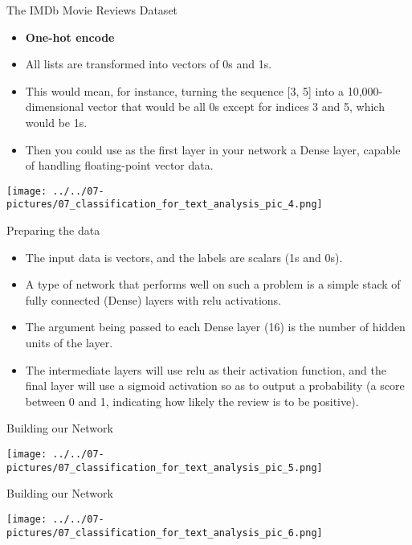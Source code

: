 \documentclass[11pt]{beamer}
\begin{document}
\begin{frame}{The IMDb Movie Reviews Dataset}
	\begin{itemize}
		\item \textbf{One-hot encode}
		\item All lists are transformed into vectors of 0s and 1s. 
		\item This would mean, for instance, turning the sequence [3, 5] into a 10,000-dimensional vector that would be all 0s except for indices 3 and 5, which would be 1s. 
		\item Then you could use as the first layer in your network a Dense layer, capable of handling floating-point vector data.
	\end{itemize}
	\begin{center}
	\texttt{[image: ../../07-pictures/07\_classification\_for\_text\_analysis\_pic\_4.png]}
	\end{center}
\end{frame}
\begin{frame}{Preparing the data}
	\begin{itemize}
		\item The input data is vectors, and the labels are scalars (1s and 0s). 
		\item A type of network that performs well on such a problem is a simple stack of fully connected (Dense) layers with relu activations.
		\item The argument being passed to each Dense layer (16) is the number of hidden units of the layer.
		\item The intermediate layers will use relu as their activation function, and the final layer will use a sigmoid activation so as to output a probability (a score between 0 and 1, indicating how likely the review is to be positive). 
	\end{itemize}
\end{frame}
\begin{frame}{Building our Network}
	\begin{center}
	\texttt{[image: ../../07-pictures/07\_classification\_for\_text\_analysis\_pic\_5.png]}
	\end{center}
\end{frame}
\begin{frame}{Building our Network}
	\begin{center}
	\texttt{[image: ../../07-pictures/07\_classification\_for\_text\_analysis\_pic\_6.png]}
	\end{center}
\end{frame}
\end{document}
